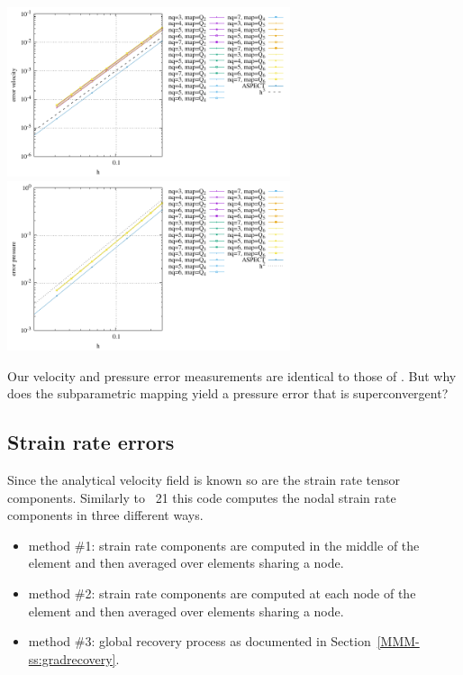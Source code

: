 \begin{center}
\includegraphics[width=8.3cm]{python_codes/fieldstone_152/RESULTS/exp0/errv}
\includegraphics[width=8.3cm]{python_codes/fieldstone_152/RESULTS/exp0/errp}
\end{center}

Our velocity and pressure error measurements are identical to those of \aspect.
But why does the subparametric mapping yield a pressure error that is superconvergent?

\subsection*{Strain rate errors}

Since the analytical velocity field is known so are the strain rate tensor components.
Similarly to \stone~21 this code computes the nodal strain rate components
in three different ways. 
\begin{itemize}
\item method \#1: strain rate components are computed in the middle of the element and then averaged over elements sharing a node.
\item method \#2: strain rate components are computed at each node of the element and then averaged over elements sharing a node.
\item method \#3: global recovery process as documented in Section~\ref{MMM-ss:gradrecovery}.
\end{itemize}

